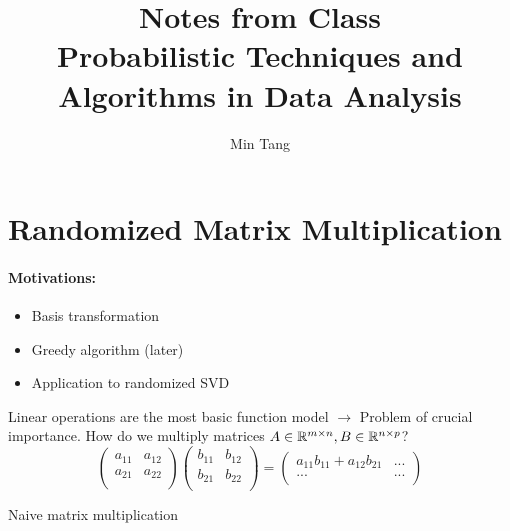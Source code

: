 
\title{ Notes from Class \vspace{0.5pc} \\ \large{Probabilistic Techniques and Algorithms in Data Analysis}}
\author{Min Tang}

\newpage
\setcounter{section}{1}
\setcounter{page}{2}
\section{Randomized Matrix Multiplication}
\paragraph{Motivations:}
\begin{itemize}
\item Basis transformation
\item Greedy algorithm (later)
\item Application to randomized SVD
\end{itemize}
Linear operations are the most basic function model $\rightarrow$ Problem of crucial importance. How do we multiply matrices $A\in \mathbb{R}^{m\times n}, B\in \mathbb{R}^{n\times p}$?
\begin{equation*}
\begin{pmatrix}
a_{11} & a_{12} \\
a_{21} & a_{22} \\
\end{pmatrix}
\begin{pmatrix}
b_{11} & b_{12} \\
b_{21} & b_{22} \\
\end{pmatrix} =
\begin{pmatrix}
a_{11} b_{11} + a_{12} b_{21} & ... \\
... & ... \\
\end{pmatrix}
\end{equation*}
\begin{algorithm}[H]
\caption{Naive matrix multiplication}
\end{algorithm}
